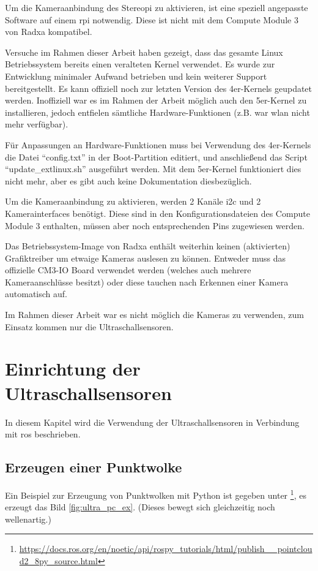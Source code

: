 Um die Kameraanbindung des Stereopi zu aktivieren, ist eine speziell angepasste Software auf einem \gls{rpi} notwendig. Diese ist nicht mit dem Compute Module 3 von Radxa kompatibel.

Versuche im Rahmen dieser Arbeit haben gezeigt, dass das gesamte Linux Betriebssystem bereits einen veralteten Kernel verwendet. Es wurde zur Entwicklung minimaler Aufwand betrieben und kein weiterer Support bereitgestellt. Es kann offiziell noch zur letzten Version des 4er-Kernels geupdatet werden. Inoffiziell war es im Rahmen der Arbeit möglich auch den 5er-Kernel zu installieren, jedoch entfielen sämtliche Hardware-Funktionen (z.B. war \gls{wlan} nicht mehr verfügbar).

Für Anpassungen an Hardware-Funktionen muss bei Verwendung des 4er-Kernels die Datei \enquote{config.txt} in der Boot-Partition editiert, und anschließend das Script \enquote{update\_extlinux.sh} ausgeführt werden. Mit dem 5er-Kernel funktioniert dies nicht mehr, aber es gibt auch keine Dokumentation diesbezüglich.

Um die Kameraanbindung zu aktivieren, werden 2 Kanäle \gls{i2c} und 2 Kamerainterfaces benötigt. Diese sind in den Konfigurationsdateien des Compute Module 3 enthalten, müssen aber noch entsprechenden Pins zugewiesen werden.

Das Betriebssystem-Image von Radxa enthält weiterhin keinen (aktivierten) Grafiktreiber um etwaige Kameras auslesen zu können. Entweder muss das offizielle CM3-IO Board verwendet werden (welches auch mehrere Kameraanschlüsse besitzt) oder diese tauchen nach Erkennen einer Kamera automatisch auf.\newline

Im Rahmen dieser Arbeit war es nicht möglich die Kameras zu verwenden, zum Einsatz kommen nur die Ultraschallsensoren.

\section{Einrichtung der Ultraschallsensoren}
In diesem Kapitel wird die Verwendung der Ultraschallsensoren in Verbindung mit \acrshort{ros} beschrieben.

\subsection{Erzeugen einer Punktwolke}
Ein Beispiel zur Erzeugung von Punktwolken mit Python ist gegeben unter \footnote{\url{https://docs.ros.org/en/noetic/api/rospy_tutorials/html/publish__pointcloud2_8py_source.html}}, es erzeugt das Bild \ref{fig:ultra_pc_ex}. (Dieses bewegt sich gleichzeitig noch wellenartig.)

